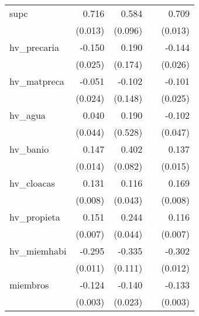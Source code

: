 {\begin{longtable}{l*{4}{D{.}{.}{-1}}}
\addlinespace
supc        &       0.716\sym{***}&       0.584\sym{***}&                     &       0.709\sym{***}\\
            &     (0.013)         &     (0.096)         &                     &     (0.013)         \\
\addlinespace
hv\_precaria &      -0.150\sym{***}&       0.190         &                     &      -0.144\sym{***}\\
            &     (0.025)         &     (0.174)         &                     &     (0.026)         \\
\addlinespace
hv\_matpreca &      -0.051\sym{*}  &      -0.102         &                     &      -0.101\sym{***}\\
            &     (0.024)         &     (0.148)         &                     &     (0.025)         \\
\addlinespace
hv\_agua     &       0.040         &       0.190         &                     &      -0.102\sym{*}  \\
            &     (0.044)         &     (0.528)         &                     &     (0.047)         \\
\addlinespace
hv\_banio    &       0.147\sym{***}&       0.402\sym{***}&                     &       0.137\sym{***}\\
            &     (0.014)         &     (0.082)         &                     &     (0.015)         \\
\addlinespace
hv\_cloacas  &       0.131\sym{***}&       0.116\sym{**} &                     &       0.169\sym{***}\\
            &     (0.008)         &     (0.043)         &                     &     (0.008)         \\
\addlinespace
hv\_propieta &       0.151\sym{***}&       0.244\sym{***}&                     &       0.116\sym{***}\\
            &     (0.007)         &     (0.044)         &                     &     (0.007)         \\
\addlinespace
hv\_miemhabi &      -0.295\sym{***}&      -0.335\sym{**} &                     &      -0.302\sym{***}\\
            &     (0.011)         &     (0.111)         &                     &     (0.012)         \\
\addlinespace
miembros    &      -0.124\sym{***}&      -0.140\sym{***}&                     &      -0.133\sym{***}\\
            &     (0.003)         &     (0.023)         &                     &     (0.003)         \\

\end{longtable}}
